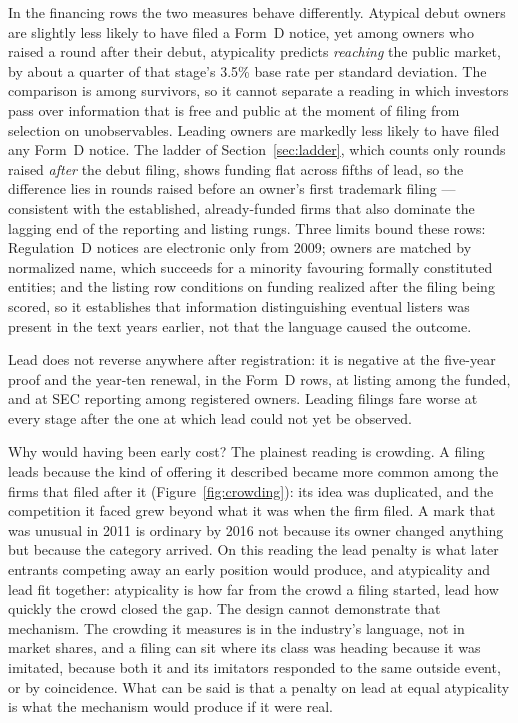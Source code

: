 In the financing rows the two measures behave differently. Atypical
debut owners are slightly less likely to have filed a Form~D notice, yet
among owners who raised a round after their debut, atypicality predicts
\emph{reaching} the public market, by about a quarter of that stage's
3.5\% base rate per standard deviation. The comparison is among
survivors, so it cannot separate a reading in which investors pass over
information that is free and public at the moment of filing from
selection on unobservables. Leading owners are markedly less likely to
have filed any Form~D notice. The ladder of Section~\ref{sec:ladder},
which counts only rounds raised \emph{after} the debut filing, shows
funding flat across fifths of lead, so the difference lies in rounds
raised before an owner's first trademark filing --- consistent with the
established, already-funded firms that also dominate the lagging end of
the reporting and listing rungs. Three limits bound these rows:
Regulation~D notices are electronic only from 2009; owners are matched
by normalized name, which succeeds for a minority favouring formally
constituted entities; and the listing row conditions on funding realized
after the filing being scored, so it establishes that information
distinguishing eventual listers was present in the text years earlier,
not that the language caused the outcome.

Lead does not reverse anywhere after registration: it is negative at the
five-year proof and the year-ten renewal, in the Form~D rows, at listing
among the funded, and at SEC reporting among registered owners. Leading
filings fare worse at every stage after the one at which lead could not
yet be observed.

Why would having been early cost? The plainest reading is crowding. A
filing leads because the kind of offering it described became more
common among the firms that filed after it (Figure~\ref{fig:crowding}):
its idea was duplicated, and the competition it faced grew beyond what it
was when the firm filed. A mark that was unusual in 2011 is ordinary by
2016 not because its owner changed anything but because the category
arrived. On this reading the lead penalty is what later entrants
competing away an early position would produce, and atypicality and
lead fit together: atypicality is how far from the crowd a filing
started, lead how quickly the crowd closed the gap. The design cannot
demonstrate that mechanism. The crowding it measures is in the
industry's language, not in market shares, and a filing can sit where
its class was heading because it was imitated, because both it and its
imitators responded to the same outside event, or by coincidence. What
can be said is that a penalty on lead at equal atypicality is what the
mechanism would produce if it were real.

